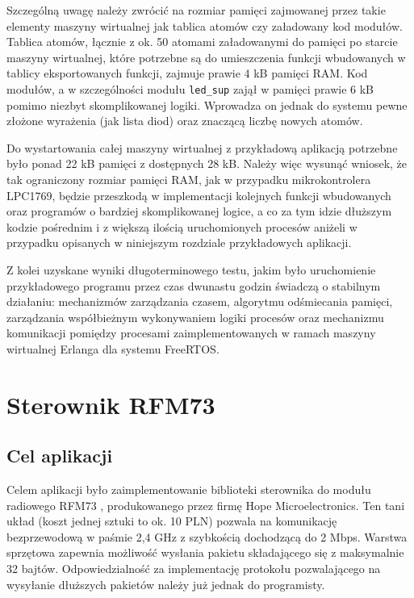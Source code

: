 Szczególną uwagę należy zwrócić na rozmiar pamięci zajmowanej przez takie elementy maszyny wirtualnej jak tablica atomów czy załadowany kod modułów.
Tablica atomów, łącznie z ok. 50 atomami załadowanymi do pamięci po starcie maszyny wirtualnej, które potrzebne są do umieszczenia funkcji wbudowanych w tablicy eksportowanych funkcji, zajmuje prawie 4 kB pamięci RAM.  
Kod modułów, a w szczególności modułu \texttt{led\_sup} zajął w pamięci prawie 6 kB pomimo niezbyt skomplikowanej logiki. Wprowadza on jednak do systemu pewne złożone wyrażenia (jak lista diod) oraz znaczącą liczbę nowych atomów.

Do wystartowania całej maszyny wirtualnej z przykładową aplikacją potrzebne było ponad 22 kB pamięci z dostępnych 28 kB.
Należy więc wysunąć wniosek, że tak ograniczony rozmiar pamięci RAM, jak w przypadku mikrokontrolera LPC1769, będzie przeszkodą w implementacji kolejnych funkcji wbudowanych oraz programów o bardziej skomplikowanej logice, a co za tym idzie dłuższym kodzie pośrednim i z większą ilością uruchomionych procesów aniżeli w przypadku opisanych w niniejszym rozdziale przykładowych aplikacji.

Z kolei uzyskane wyniki długoterminowego testu, jakim było uruchomienie przykładowego programu przez czas dwunastu godzin świadczą o stabilnym działaniu: mechanizmów zarządzania czasem, algorytmu odśmiecania pamięci, zarządzania współbieżnym wykonywaniem logiki procesów oraz mechanizmu komunikacji pomiędzy procesami zaimplementowanych w ramach maszyny wirtualnej Erlanga dla systemu FreeRTOS.

\section{Sterownik RFM73}
\label{sec:przykladyRfm}

\subsection{Cel aplikacji}

Celem aplikacji było zaimplementowanie biblioteki sterownika do modułu radiowego RFM73 \cite{RFM73}, produkowanego przez firmę Hope Microelectronics.
Ten tani układ (koszt jednej sztuki to ok. 10 PLN) pozwala na komunikację bezprzewodową w paśmie 2,4 GHz z szybkością dochodzącą do 2 Mbps. Warstwa sprzętowa zapewnia możliwość wysłania pakietu składającego się z maksymalnie 32 bajtów.
Odpowiedzialność za implementację protokołu pozwalającego na wysyłanie dłuższych pakietów należy już jednak do programisty.

